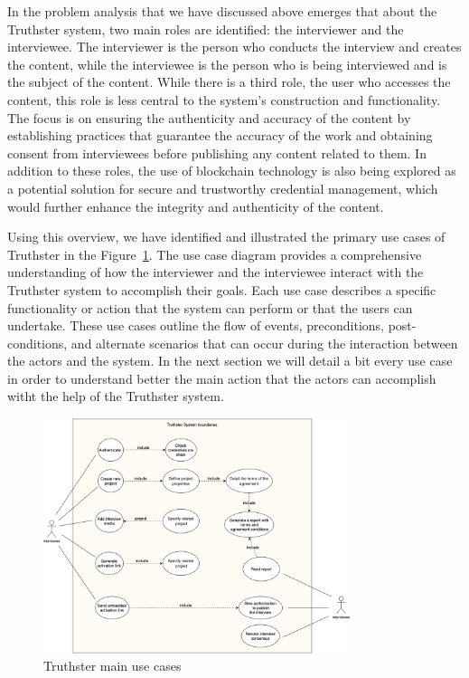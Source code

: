 \documentclass[target=mst,aauheader=]{thud}
\begin{document}
In the problem analysis that we have discussed above emerges that about the Truthster system, two main roles are identified: the interviewer and the interviewee. The interviewer is the person who conducts the interview and creates the content, while the interviewee is the person who is being interviewed and is the subject of the content.
While there is a third role, the user who accesses the content, this role is less central to the system's construction and functionality. The focus is on ensuring the authenticity and accuracy of the content by establishing practices that guarantee the accuracy of the work and obtaining consent from interviewees before publishing any content related to them.
In addition to these roles, the use of blockchain technology is also being explored as a potential solution for secure and trustworthy credential management, which would further enhance the integrity and authenticity of the content.\par

Using this overview, we have identified and illustrated the primary use cases of Truthster in the Figure~\ref{fig:useCaseDiagram}.
The use case diagram provides a comprehensive understanding of how the interviewer and the interviewee interact with the Truthster system to accomplish their goals. Each use case describes a specific functionality or action that the system can perform or that the users can undertake. These use cases outline the flow of events, preconditions, post-conditions, and alternate scenarios that can occur during the interaction between the actors and the system. In the next section we will detail a bit every use case in order to understand better the main action that the actors can accomplish witht the help of the Truthster system.

\begin{figure}
    \centering
    \includegraphics[width=0.8\textwidth]{images/truthster_use_cases.png}
    \caption{Truthster main use cases}
    \label{fig:useCaseDiagram}
\end{figure}
\end{document}
